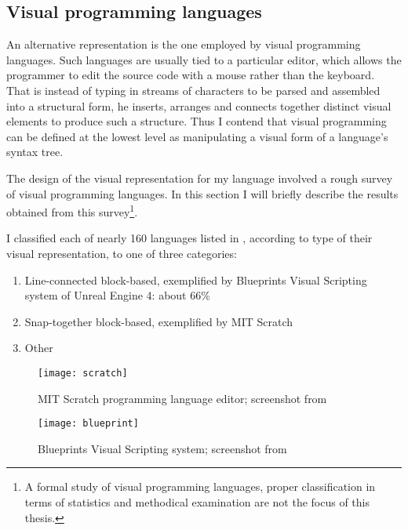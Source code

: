 \subsection{Visual programming languages}
An alternative representation is the one employed by visual programming
languages. Such languages are usually tied to a particular editor, which allows
the programmer to edit the source code with a mouse rather than the
keyboard. That is instead of typing in streams of characters to be parsed and
assembled into a structural form, he inserts, arranges and connects together
distinct visual elements to produce such a structure. Thus I contend that visual
programming can be defined at the lowest level as manipulating a visual form of
a language's syntax tree.

The design of the visual representation for my language involved a rough survey
of visual programming languages. In this section I will briefly describe the
results obtained from this survey\footnote{A formal study of visual programming
  languages, proper classification in terms of statistics and methodical
  examination are not the focus of this thesis. }.

I classified each of nearly 160 languages listed in \cite{snapshots}, according
to type of their visual representation, to one of three categories:
\begin{enumerate}
    \item Line-connected block-based, exemplified by Blueprints Visual
    Scripting system of Unreal Engine 4\cite{blueprint}: about 66\%
    \item Snap-together block-based, exemplified by MIT Scratch\cite{scratch, scratch_wikipedia}
    \item Other
\end{enumerate}


\begin{figure}[h!]
\centering \texttt{[image: scratch]}
\caption{
    MIT Scratch programming language editor;
    screenshot from \protect\cite{fig_scratch}
}
\label{fig:scratch}
\end{figure}

\begin{figure}[h!]
\centering \texttt{[image: blueprint]}
\caption{
    Blueprints Visual Scripting system;
    screenshot from \protect\cite{fig_blueprint}
}
\label{fig:blueprint}
\end{figure}


